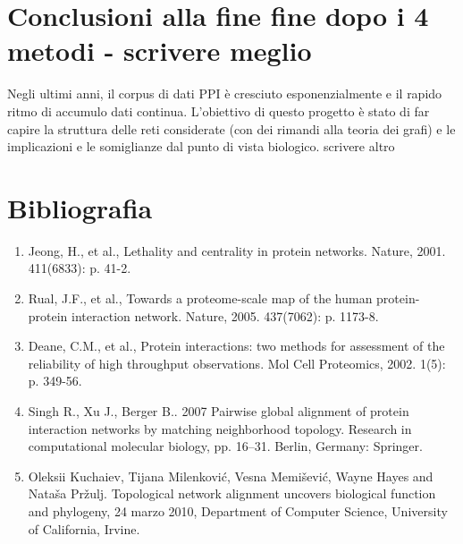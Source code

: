 \documentclass[11pt]{article}
\begin{document}
\pagebreak
\section{Conclusioni alla fine fine dopo i 4 metodi - scrivere meglio}
Negli ultimi anni, il corpus di dati PPI è cresciuto esponenzialmente e il rapido ritmo di accumulo dati continua. L'obiettivo di questo progetto è stato di far capire la struttura delle reti considerate (con dei rimandi alla teoria dei grafi) e le implicazioni  e le somiglianze dal punto di vista biologico. scrivere altro

\pagebreak 
\section{Bibliografia} 
\begin{enumerate}
\item Jeong, H., et al., Lethality and centrality in protein networks. Nature, 2001. 411(6833): p. 41-2.

\item Rual, J.F., et al., Towards a proteome-scale map of the human protein-protein interaction network. Nature, 2005. 437(7062): p. 1173-8.

\item Deane, C.M., et al., Protein interactions: two methods for assessment of the reliability of high throughput observations. Mol Cell Proteomics, 2002. 1(5): p. 349-56.

\item Singh R., Xu J., Berger B.. 2007 Pairwise global alignment of protein interaction networks by matching neighborhood topology. Research in computational molecular biology, pp. 16–31. Berlin, Germany: Springer.

\item Oleksii Kuchaiev, Tijana Milenković, Vesna Memišević, Wayne Hayes and Nataša Pržulj. Topological network alignment uncovers biological function and phylogeny, 24 marzo 2010, Department of Computer Science, University of California, Irvine.


\end{enumerate}
\end{document}
